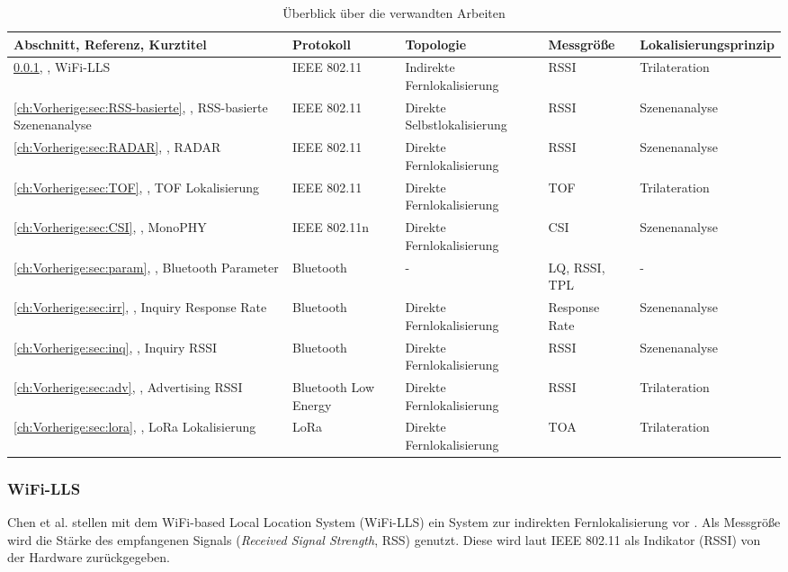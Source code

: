 \begin{table}[h!]
	\centering
	\caption{Überblick über die verwandten Arbeiten}
	\label{table:verwandte}
	\begin{tabular}{p{3.7cm}|p{1.7cm}|p{2cm}|p{2cm}|p{2.3cm}}
		Abschnitt, Referenz, Kurztitel & Protokoll & Topologie & Messgröße & Lokalisier\-ungsprinzip\\
		\hline
		\ref{ch:Vorherige:sec:LLS}, \cite{chen2007design}, WiFi-LLS & IEEE 802.11 & Indirekte Fernlokalisierung & RSSI & Trilateration \\
		\hline
		\ref{ch:Vorherige:sec:RSS-basierte}, \cite{prasithsangaree2002indoor}, RSS-basierte Szenenanalyse & IEEE 802.11 & Direkte Selbstlokalisierung & RSSI & Szenenanalyse \\
		\hline
		\ref{ch:Vorherige:sec:RADAR}, \cite{bahl2000radar}, RADAR & IEEE 802.11 & Direkte Fernlokalisierung & RSSI & Szenenanalyse \\
		\hline
		\ref{ch:Vorherige:sec:TOF}, \cite{wibowo2009time}, TOF Lokalisierung & IEEE 802.11 & Direkte Fernlokalisierung & TOF & Trilateration \\
		\hline
		\ref{ch:Vorherige:sec:CSI}, \cite{abdel2013monophy}, MonoPHY & IEEE 802.11n & Direkte Fernlokalisierung & CSI & Szenenanalyse \\
		\hline
		\ref{ch:Vorherige:sec:param}, \cite{hossain2007comprehensive}, Bluetooth Parameter & Bluetooth & - & LQ, RSSI, TPL & - \\
		\hline
		\ref{ch:Vorherige:sec:irr}, \cite{bargh2008indoor}, Inquiry Response Rate & Bluetooth & Direkte Fernlokalisierung & Response Rate & Szenenanalyse \\
		\hline
		\ref{ch:Vorherige:sec:inq}, \cite{ling2010inquiry}, Inquiry RSSI & Bluetooth & Direkte Fernlokalisierung & RSSI & Szenenanalyse \\
		\hline
		\ref{ch:Vorherige:sec:adv}, \cite{jianyong2014rssi}, Advertising RSSI & Bluetooth Low Energy & Direkte Fernlokalisierung & RSSI & Trilateration \\
		\hline
		\ref{ch:Vorherige:sec:lora}, \cite{kim2016poster}, LoRa Lokalisierung & LoRa & Direkte Fernlokalisierung & TOA & Trilateration \\
	\end{tabular}
\end{table}

\subsubsection{WiFi-LLS}
\label{ch:Vorherige:sec:LLS}
Chen et al. stellen mit dem WiFi-based Local Location System (WiFi-LLS) ein System zur indirekten Fernlokalisierung vor \cite{chen2007design}.
Als Messgröße wird die Stärke des empfangenen Signals (\emph{Received Signal Strength}, RSS) genutzt. 
Diese wird laut IEEE 802.11 als Indikator (RSSI) von der Hardware zurückgegeben. 

